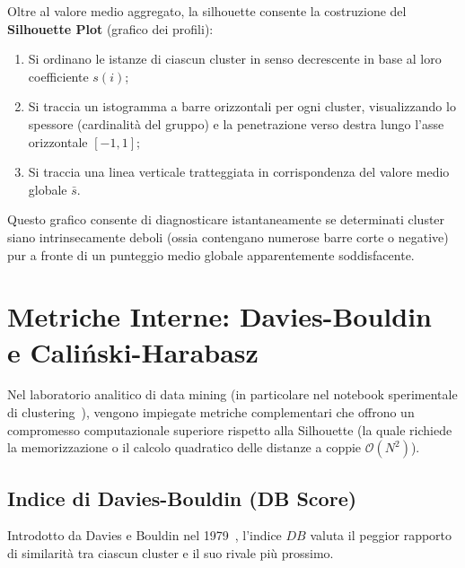 Oltre al valore medio aggregato, la silhouette consente la costruzione del \textbf{Silhouette Plot} (grafico dei profili):
\begin{enumerate}
    \item Si ordinano le istanze di ciascun cluster in senso decrescente in base al loro coefficiente $s(i)$;
    \item Si traccia un istogramma a barre orizzontali per ogni cluster, visualizzando lo spessore (cardinalità del gruppo) e la penetrazione verso destra lungo l'asse orizzontale $[-1, 1]$;
    \item Si traccia una linea verticale tratteggiata in corrispondenza del valore medio globale $\bar{s}$.
\end{enumerate}
Questo grafico consente di diagnosticare istantaneamente se determinati cluster siano intrinsecamente deboli (ossia contengano numerose barre corte o negative) pur a fronte di un punteggio medio globale apparentemente soddisfacente.

\section[Metriche Interne: Davies-Bouldin e Cali\'nski-Harabasz]{Metriche Interne: Davies-Bouldin\\e Cali\'nski-Harabasz}
\label{sec:dm-additional-internal-indices}

Nel laboratorio analitico di data mining (in particolare nel notebook sperimentale di clustering~\cite{tan2018}), vengono impiegate metriche complementari che offrono un compromesso computazionale superiore rispetto alla Silhouette (la quale richiede la memorizzazione o il calcolo quadratico delle distanze a coppie $\mathcal{O}(N^2)$).

\FloatBarrier
\subsection{Indice di Davies-Bouldin (DB Score)}
Introdotto da Davies e Bouldin nel 1979~\cite{davies1979}, l'indice $DB$ valuta il peggior rapporto di similarità tra ciascun cluster e il suo rivale più prossimo.

